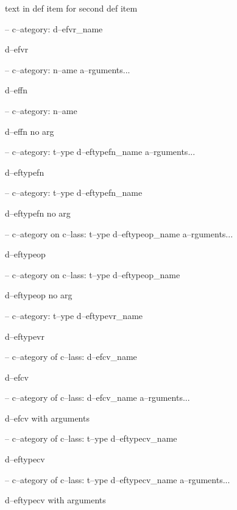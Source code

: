 \documentclass{book}
\begin{document}
%
text in def item for second def item


\hbox{}-- c--ategory: d--efvr\_name


%
d--efvr

\hbox{}-- c--ategory: n--ame a--rguments...


%
d--effn

\hbox{}-- c--ategory: n--ame


%
d--effn no arg

\hbox{}-- c--ategory: t--ype d--eftypefn\_name a--rguments...


%
d--eftypefn

\hbox{}-- c--ategory: t--ype d--eftypefn\_name


%
d--eftypefn no arg

\hbox{}-- c--ategory on c--lass: t--ype d--eftypeop\_name a--rguments...


%
d--eftypeop

\hbox{}-- c--ategory on c--lass: t--ype d--eftypeop\_name


%
d--eftypeop no arg

\hbox{}-- c--ategory: t--ype d--eftypevr\_name


%
d--eftypevr

\hbox{}-- c--ategory of c--lass: d--efcv\_name


%
d--efcv

\hbox{}-- c--ategory of c--lass: d--efcv\_name a--rguments...


%
d--efcv with arguments

\hbox{}-- c--ategory of c--lass: t--ype d--eftypecv\_name


%
d--eftypecv

\hbox{}-- c--ategory of c--lass: t--ype d--eftypecv\_name a--rguments...


%
d--eftypecv with arguments
\end{document}

